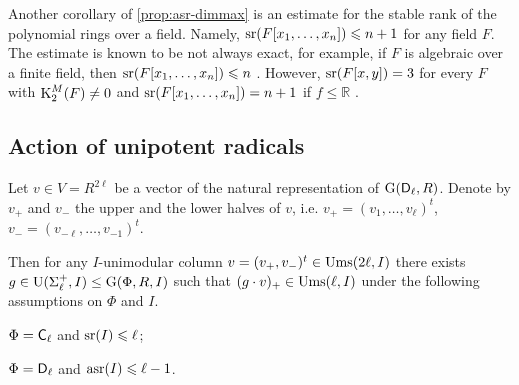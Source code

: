 Another corollary of \cref{prop:asr-dimmax} is an estimate for the stable rank of the polynomial rings over a field. Namely, $\operatorname{sr}(F[x_1,\ldots,x_n])\leqslant n+1$ for any field $F$. The estimate is known to be not always exact, for example, if $F$ is algebraic over a finite field, then $\operatorname{sr}(F[x_1,\ldots,x_n])\leqslant n$ \cite[Corollary~17.4]{VasSusSerreProblem}. However, $\operatorname{sr}(F[x,y])=3$ for every $F$ with $\operatorname{K}_2^M(F)\neq0$ \cite{KrusenmeyerThesis} and $\operatorname{sr}(F[x_1,\ldots,x_n])=n+1$ if $f\leqslant\mathbb{R}$ \cite{Va71}.

\subsection{Action of unipotent radicals}\label{sec:ur-action}
Let $v\in V=R^{2\ell}$ be a vector of the natural representation of $\operatorname{G}(\mathsf{D}_\ell, R)$.
Denote by $v_+$ and $v_-$ the upper and the lower halves of $v$, i.e. $v_+=(v_1,\ldots, v_\ell)^t$, $v_-=(v_{-\ell},\ldots, v_{-1})^t$.
\begin{lemma}\label{lemma:asrUnip}
Then for any $I$-unimodular column $v=(v_+, v_-)^t\in\operatorname{Ums}(2\ell, I)$ there exists $g\in\operatorname{U}(\Sigma^+_\ell, I) \leq \operatorname{G}(\Phi, R, I)$ such that $(g \cdot v)_+ \in \operatorname{Ums}(\ell, I)$ under the following assumptions on $\Phi$ and $I$.
\begin{thmlist}
\item \label{item:asrUnipC} $\Phi=\mathsf{C}_\ell$ and $\operatorname{sr}(I) \leqslant \ell$;
\item \label{item:asrUnipD} $\Phi=\mathsf{D}_\ell$ and $\operatorname{asr}(I)\leqslant \ell -1$.
\end{thmlist}
\end{lemma}
